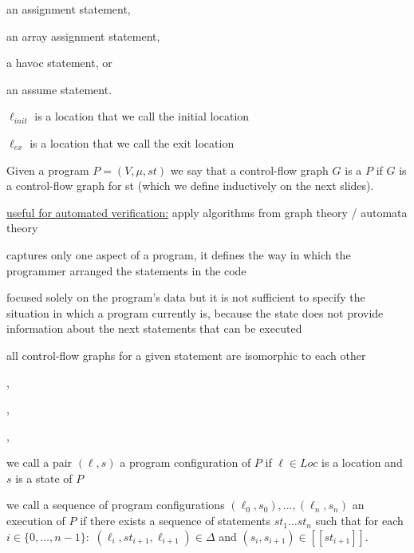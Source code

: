 \documentclass[landscape, a4paper]{article}
\begin{document}
\begin{minipage}[t]{0.2\linewidth}
\begin{betterlist}
\begin{betterlist}
\begin{betterlist}
				\item an assignment statement,
				\item an array assignment statement,
				\item a havoc statement, or
				\item an assume statement.
			\end{betterlist}
			\item $\ell_{init}$ is a location that we call the \alert{initial location}
			\item $\ell_{ex}$ is a location that we call the \alert{exit location}
		\end{betterlist}
    \item Given a program $P = (V , \mu , st)$ we say that a control-flow graph $G$ is a  $P$ if $G$ is a control-flow graph for st (which we define inductively on the next slides). 
		\begin{betterlist}
			\item \underline{useful for automated verification:} apply algorithms from graph theory / automata theory
			\item captures only one aspect of a program, it defines the way in which the programmer arranged the statements in the code
			\item focused solely on the program’s data but it is not sufficient to specify the situation in which a program currently is, because the state does not provide information about the next statements that can be executed
			\item {}
			\item all control-flow graphs for a given statement are \alert{isomorphic} to each other
		\end{betterlist}
		\item {}, 
		\item {}, 
		\item {}, 
		\item we call a pair $(\ell, s)$ a \alert{program configuration} of $P$ if $\ell \in Loc$ is a location and $s$ is a state of $P$
		\item we call a sequence of program configurations $(\ell_0, s_0), . . . , (\ell_n, s_n)$ an \alert{execution} of $P$ if there exists a sequence of statements $st_1 \ldots st_n$ such that for each $i \in \{0, \ldots, n−1\}:$ $(\ell_i, st_{i+1}, \ell_{i+1}) \in \Delta$ and $(s_i, s_{i+1}) \in [[st_{i+1}]]$. 

\end{betterlist}
\end{minipage}
\end{document}
